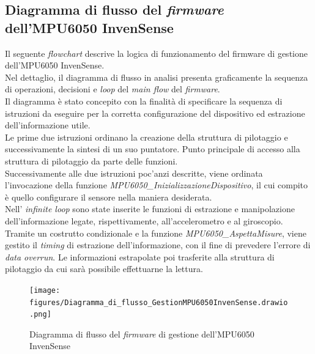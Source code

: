\documentclass[11pt]{report}
\begin{document}
\subsection{Diagramma di flusso del \textit{firmware} \\dell'MPU6050 InvenSense}
Il seguente \textit{flowchart} descrive la logica di funzionamento del firmware di gestione dell'MPU6050 InvenSense.\\
Nel dettaglio, il diagramma di flusso in analisi presenta graficamente la sequenza di operazioni, decisioni e \textit{loop} del \textit{main flow} del \textit{firmware}.\\
Il diagramma è stato concepito con la finalità di specificare la sequenza di istruzioni da eseguire per la corretta configurazione del dispositivo ed estrazione dell'informazione utile.\\
Le prime due istruzioni ordinano la creazione della struttura di pilotaggio e successivamente la sintesi di un suo puntatore. Punto principale di accesso alla struttura di pilotaggio da parte delle funzioni.\\
Successivamente alle due istruzioni poc'anzi descritte, viene ordinata l'invocazione della  funzione \textit{MPU6050\_InizializzazioneDispositivo}, il cui compito è quello configurare il sensore nella maniera desiderata.\\
Nell' \textit{infinite loop} sono state inserite le funzioni di estrazione e manipolazione dell'informazione legate, rispettivamente, all'accelerometro e al giroscopio.
Tramite un costrutto condizionale e la funzione \textit{MPU6050\_AspettaMisure}, viene gestito il \textit{timing} di estrazione dell'informazione, con il fine di prevedere l'errore di \textit{data overrun}.
Le informazioni estrapolate  poi trasferite alla struttura di pilotaggio da cui sarà possibile effettuarne la lettura.

\begin{figure}[H]
    \centering
    \texttt{[image: figures/Diagramma\_di\_flusso\_GestionMPU6050InvenSense.drawio.png]}
    \caption{Diagramma di flusso del \textit{firmware} di gestione dell'MPU6050 InvenSense}
    \label{fig:diagramma 2.1}
\end{figure}

\newpage
\end{document}
